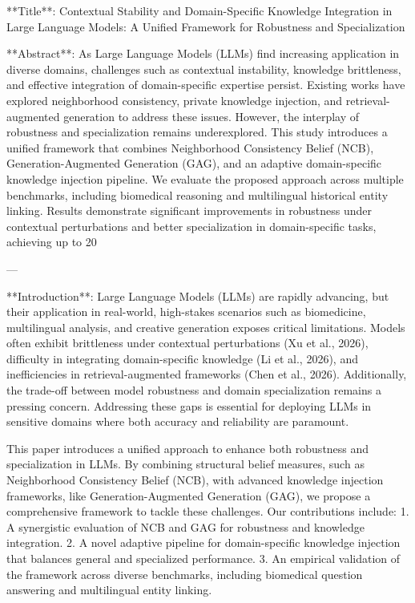 **Title**: Contextual Stability and Domain-Specific Knowledge Integration in Large Language Models: A Unified Framework for Robustness and Specialization  

**Abstract**:  
As Large Language Models (LLMs) find increasing application in diverse domains, challenges such as contextual instability, knowledge brittleness, and effective integration of domain-specific expertise persist. Existing works have explored neighborhood consistency, private knowledge injection, and retrieval-augmented generation to address these issues. However, the interplay of robustness and specialization remains underexplored. This study introduces a unified framework that combines Neighborhood Consistency Belief (NCB), Generation-Augmented Generation (GAG), and an adaptive domain-specific knowledge injection pipeline. We evaluate the proposed approach across multiple benchmarks, including biomedical reasoning and multilingual historical entity linking. Results demonstrate significant improvements in robustness under contextual perturbations and better specialization in domain-specific tasks, achieving up to 20%

---

**Introduction**:  
Large Language Models (LLMs) are rapidly advancing, but their application in real-world, high-stakes scenarios such as biomedicine, multilingual analysis, and creative generation exposes critical limitations. Models often exhibit brittleness under contextual perturbations (Xu et al., 2026), difficulty in integrating domain-specific knowledge (Li et al., 2026), and inefficiencies in retrieval-augmented frameworks (Chen et al., 2026). Additionally, the trade-off between model robustness and domain specialization remains a pressing concern. Addressing these gaps is essential for deploying LLMs in sensitive domains where both accuracy and reliability are paramount.  

This paper introduces a unified approach to enhance both robustness and specialization in LLMs. By combining structural belief measures, such as Neighborhood Consistency Belief (NCB), with advanced knowledge injection frameworks, like Generation-Augmented Generation (GAG), we propose a comprehensive framework to tackle these challenges. Our contributions include:  
1. A synergistic evaluation of NCB and GAG for robustness and knowledge integration.  
2. A novel adaptive pipeline for domain-specific knowledge injection that balances general and specialized performance.  
3. An empirical validation of the framework across diverse benchmarks, including biomedical question answering and multilingual entity linking.  

